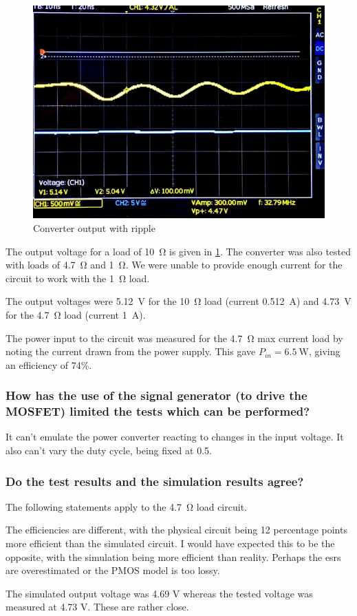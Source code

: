 \begin{figure}
	\centering
	\includegraphics[width=\linewidth]{"img/Converter Output"}
	\caption{Converter output with ripple}
	\label{fig:converter op}
\end{figure}


The output voltage for a load of \SI{10}{\ohm} is given in \cref{fig:converter op}. The converter was also tested with loads of \SI{4.7}{\ohm} and \SI{1}{\ohm}. We were unable to provide enough current for the circuit to work with the \SI{1}{\ohm} load.

The output voltages were \SI{5.12}{\volt} for the \SI{10}{\ohm} load (current \SI{0.512}{\ampere}) and \SI{4.73}{\volt} for the \SI{4.7}{\ohm} load (current \SI{1}{\ampere}).

The power input to the circuit was measured for the \SI{4.7}{\ohm} max current load by noting the current drawn from the power supply. This gave $P_{in}=\SI{6.5}{\watt}$, giving an efficiency of 74\%.

\subsubsection{How has the use of the signal generator (to drive the MOSFET) limited the tests which can be performed?}
It can't emulate the power converter reacting to changes in the input voltage. It also can't vary the duty cycle, being fixed at 0.5.
\subsubsection{Do the test results and the simulation results agree?}
The following statements apply to the \SI{4.7}{\ohm} load circuit.

The efficiencies are different, with the physical circuit being 12 percentage points more efficient than the simulated circuit. I would have expected this to be the opposite, with the simulation being more efficient than reality. Perhaps the esrs are overestimated or the PMOS model is too lossy.

The simulated output voltage was 4.69 V whereas the tested voltage was measured at 4.73 V. These are rather close.
